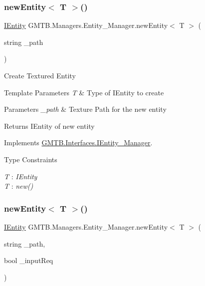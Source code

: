 \subsubsection{\texorpdfstring{newEntity$<$ T $>$()}{newEntity< T >()}\hspace{0.1cm}{\footnotesize\ttfamily [2/5]}}
{\footnotesize\ttfamily \mbox{\hyperlink{interface_g_m_t_b_1_1_interfaces_1_1_i_entity}{I\+Entity}} G\+M\+T\+B.\+Managers.\+Entity\+\_\+\+Manager.\+new\+Entity$<$ T $>$ (\begin{DoxyParamCaption}\item[{string}]{\+\_\+path }\end{DoxyParamCaption})}



Create Textured Entity 


\begin{DoxyTemplParams}{Template Parameters}
{\em T} & Type of I\+Entity to create \\
\hline
\end{DoxyTemplParams}

\begin{DoxyParams}{Parameters}
{\em \+\_\+path} & Texture Path for the new entity\\
\hline
\end{DoxyParams}
\begin{DoxyReturn}{Returns}
I\+Entity of new entity 
\end{DoxyReturn}


Implements \mbox{\hyperlink{interface_g_m_t_b_1_1_interfaces_1_1_i_entity___manager}{G\+M\+T\+B.\+Interfaces.\+I\+Entity\+\_\+\+Manager}}.

\begin{Desc}
\item[Type Constraints]\begin{description}
\item[{\em T} : {\em I\+Entity}]\item[{\em T} : {\em new()}]\end{description}
\end{Desc}
\mbox{\label{class_g_m_t_b_1_1_managers_1_1_entity___manager_a994d6ed32e14c2deb0b11a95e1edba7a}} 
\subsubsection{\texorpdfstring{newEntity$<$ T $>$()}{newEntity< T >()}\hspace{0.1cm}{\footnotesize\ttfamily [3/5]}}
{\footnotesize\ttfamily \mbox{\hyperlink{interface_g_m_t_b_1_1_interfaces_1_1_i_entity}{I\+Entity}} G\+M\+T\+B.\+Managers.\+Entity\+\_\+\+Manager.\+new\+Entity$<$ T $>$ (\begin{DoxyParamCaption}\item[{string}]{\+\_\+path,  }\item[{bool}]{\+\_\+input\+Req }\end{DoxyParamCaption})}



